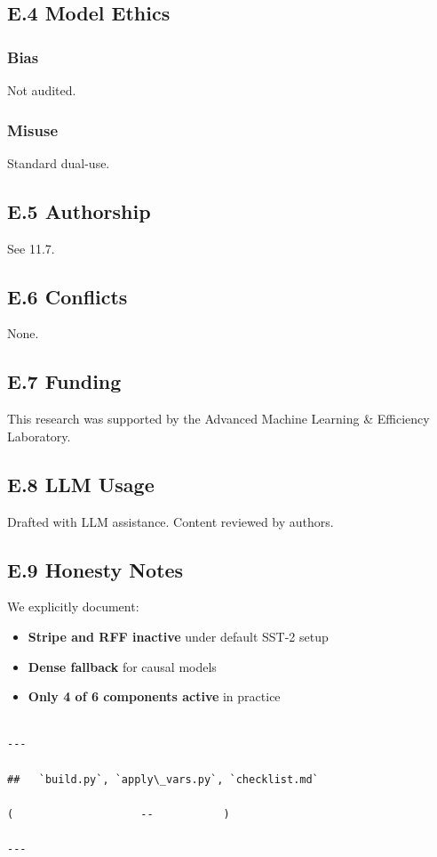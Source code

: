 \subsection{E.4 Model Ethics}

\subsubsection{Bias}
Not audited.

\subsubsection{Misuse}
Standard dual-use.

\subsection{E.5 Authorship}

See  11.7.

\subsection{E.6 Conflicts}

None.

\subsection{E.7 Funding}

This research was supported by the Advanced Machine Learning \& Efficiency Laboratory.

\subsection{E.8 LLM Usage}

Drafted with LLM assistance. Content reviewed by authors.

\subsection{E.9 Honesty Notes}

We explicitly document:
\begin{itemize}
\item \textbf{Stripe and RFF inactive} under default SST-2 setup
\item \textbf{Dense fallback} for causal models
\item \textbf{Only 4 of 6 components active} in practice
\end{itemize}
\begin{lstlisting}

---

##   `build.py`, `apply\_vars.py`, `checklist.md`

(                    --           )

---
\end{lstlisting}